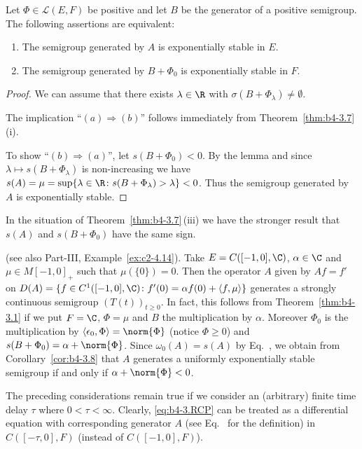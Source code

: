 \begin{corollary}\label{cor:b4-3.8}
Let $\Phi \in \mathcal{L}(E,F)$ be positive and let $B$ be the generator of a positive semigroup. 
The following assertions are equivalent:

\begin{enumerate}[\upshape (a)]
	\item 
    The semigroup generated by $A$ is exponentially stable in $E$.
	
    \item 
    The semigroup generated by $B + \Phi_{0}$ is exponentially stable in $F$.
\end{enumerate}
\end{corollary}
\begin{proof}
We can assume that there exists $\lambda \in \R$ with $\sigma(B+\Phi_{\lambda}) \neq \emptyset$.

The implication \enquote{$(a)\Rightarrow(b)$} follows immediately from Theorem~\ref{thm:b4-3.7}\,(i).

To show \enquote{$(b)\Rightarrow(a)$}, let $s(B+\Phi_{0}) < 0$. 
By the lemma and since $\lambda \mapsto s(B+\Phi_{\lambda})$ is non-increasing we have $s(A) = \mu = \sup\{\lambda \in \R \colon s(B+\Phi_{\lambda}) > \lambda\} < 0$. 
Thus the semigroup generated by $A$ is exponentially stable.
\end{proof}
\begin{remark*}
In the situation of Theorem~\ref{thm:b4-3.7}\,(iii) we have the stronger result that $s(A)$ and $s(B + \Phi_{0})$ have the same sign.
\end{remark*}
\begin{example}\label{ex:b4-3.9}
(see also Part-III, Example~\ref{ex:c2-4.14}). Take $E = C([-1,0],\C)$, $\alpha \in \C$ and $\mu \in M[-1,0]_{+}$ such that $\mu(\{0\}) = 0$. 
Then the operator $A$ given by $Af = f'$ on $D(A) = \{f \in C^1([-1,0],\C) \colon f'(0) = \alpha f(0) + \langle f,\mu\rangle\}$ generates a strongly continuous semigroup $(T(t))_{t\geq0}$. 
In fact, this follows from Theorem~\ref{thm:b4-3.1} if we put $F = \C$, $\Phi = \mu$ and $B$ the multiplication by $\alpha$. 
Moreover $\Phi_{0}$ is the multiplication by $ \langle \epsilon_{0}, \Phi  \rangle = \norm{\Phi}$ (notice 
$\Phi\geq 0$) and $s(B + \Phi_{0}) = \alpha + \norm{\Phi}$. 
Since $\omega_{0}(A) = s(A)$ by Eq.~, we obtain from Corollary~\ref{cor:b4-3.8} that $A$ generates a uniformly exponentially stable semigroup if and only if\/ $\alpha + \norm{\Phi} < 0$.
\end{example}
The preceding considerations remain true if we consider an (arbitrary) finite time delay $\tau$ where $0 < \tau < \infty$. 
Clearly, \eqref{eq:b4-3.RCP} can be treated as a differential equation with corresponding generator $A$ (see Eq.~ for the definition) in $C([-\tau,0],F)$ (instead of\/ $C([-1,0],F)$).

